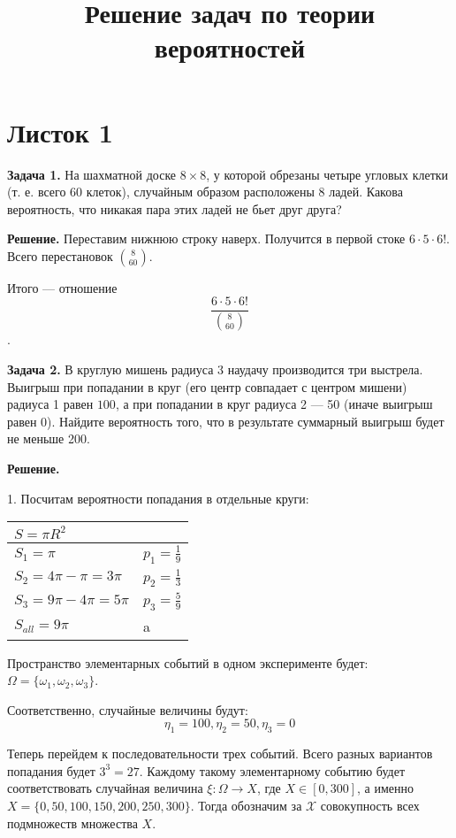 \documentclass{article}
\title{Решение задач по теории вероятностей}
\begin{document}
\maketitle

\tableofcontents

\section{Листок 1}

\textbf{Задача 1.}
На шахматной доске $8 \times 8$, у которой обрезаны четыре угловых клетки (т. е. всего 60 клеток), случайным образом расположены 8 ладей. Какова вероятность, что никакая пара этих ладей не бьет друг друга?

\textbf{Решение. } 
Переставим нижнюю строку наверх.
Получится в первой стоке $6\cdot5\cdot6!$.
Всего перестановок $\binom{8}{60}$.

Итого --- отношение $$\frac{6\cdot5\cdot6!}{\binom{8}{60}}$$.

\textbf{Задача 2.}
В круглую мишень радиуса 3 наудачу производится три выстрела. Выигрыш при попадании в круг (его центр совпадает с центром мишени) радиуса 1 равен $100$, а при попадании в круг радиуса 2 --- 50 (иначе выигрыш равен 0). Найдите вероятность того, что в результате суммарный выигрыш будет не меньше 200.

\textbf{Решение.}

1. Посчитам вероятности попадания в отдельные круги:\\
\begin{center}
\begin{tabular}{ l l }
	$S=\pi R^2$ &  \\
	\hline
	$S_1=\pi$
	& $p_1=\frac{1}{9}$ \\
	\hline
	$S_2=4\pi -\pi=3\pi$ 
	& $p_2=\frac{1}{3}$ \\
	\hline
	$S_3=9\pi-4\pi=5\pi$
	& $p_3=\frac{5}{9}$ \\
	\hline
	$S_{all}=9\pi$&a
\end{tabular}
\end{center}

Пространство элементарных событий в одном эксперименте будет: $\Omega = \{\omega_1, \omega_2, \omega_3\}$.

Соответственно, случайные величины будут: 
$$
\eta_1=100, \eta_2=50, \eta_3=0
$$

Теперь перейдем к последовательности трех событий. Всего разных вариантов попадания будет $3^3=27$. 
Каждому такому элементарному событию будет соответствовать случайная величина $\xi: \Omega \to X$,
где $X \in [0,300]$, а именно $X = \{0, 50, 100, 150, 200, 250, 300\}$.
Тогда 
обозначим за $\mathcal{X}$ совокупность всех подмножеств множества $X$.
\end{document}
